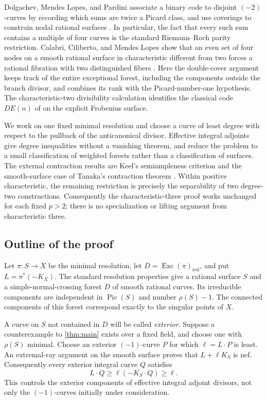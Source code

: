 \documentclass[11pt,reqno]{amsart}
\theoremstyle{definition}
\theoremstyle{remark}
\DeclareMathOperator{\Exc}{Exc}
\DeclareMathOperator{\Pic}{Pic}
\numberwithin{equation}{section}
\begin{document}
Dolgachev, Mendes Lopes, and Pardini associate a binary code to disjoint
$(-2)$-curves by recording which sums are twice a Picard class, and use
coverings to constrain nodal rational surfaces
\cite[Sections~2--3]{DolgachevMendesLopesPardini}. In particular, the
fact that every such sum contains a multiple of four curves is the
standard Riemann--Roch parity restriction.
Calabri, Ciliberto, and Mendes Lopes show that an even set of four nodes
on a smooth rational surface in characteristic different from two
forces a rational fibration with two distinguished fibers
\cite[Theorem~1.1]{CalabriCilibertoMendesLopes}. Here the double-cover argument keeps track
of the entire exceptional forest, including the components outside the
branch divisor, and combines its rank with the Picard-number-one
hypothesis. The characteristic-two divisibility calculation identifies
the classical code $DE(n)$ of
\cite[Section~2]{DolgachevMendesLopesPardini} on the explicit Frobenius
surface.

We work on one fixed minimal resolution and choose a curve of least
degree with respect to the pullback of the anticanonical divisor. Effective integral adjoints give degree inequalities
without a vanishing theorem, and reduce the problem to a small
classification of weighted forests rather than a classification of
surfaces. The external contraction results are Keel's semiampleness
criterion \cite[Theorem~0.2]{Keel} and the smooth-surface case of
Tanaka's contraction theorem \cite[Theorem~4.4]{Tanaka}.
Within positive characteristic, the remaining restriction is precisely
the separability of two degree-two constructions. Consequently the
characteristic-three proof works unchanged for each fixed $p>2$;
there is no specialization or lifting argument from characteristic
three. 

\subsection{Outline of the proof}
Let $\pi:S\to X$ be the minimal resolution, let
$D=\Exc(\pi)_{\mathrm{red}}$, and put $L=\pi^*(-K_X)$. The standard resolution properties give a rational surface
$S$ and a simple-normal-crossing forest $D$ of smooth rational curves. Its irreducible components are independent in
$\Pic(S)$ and number $\rho(S)-1$. The connected components of this
forest correspond exactly to the singular points of $X$.

A curve on $S$ not contained in $D$ will be called \emph{exterior}.
Suppose a counterexample to \cref{thm:main} exists over a fixed field,
and choose one with $\rho(S)$ minimal. Choose an exterior $(-1)$-curve
$P$ for which $\ell=L\cdot P$ is least. An extremal-ray argument on the
smooth surface proves that $L+\ell K_S$ is nef. Consequently every
exterior integral curve $Q$ satisfies
\[
 L\cdot Q\ge\ell(-K_S\cdot Q)\ge\ell.
\]
This controls the exterior components of effective integral adjoint
divisors, not only the $(-1)$-curves initially under consideration.
\end{document}
